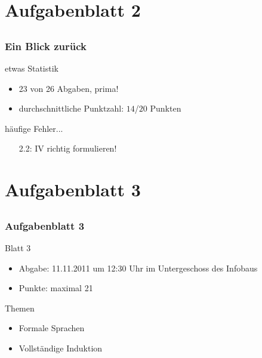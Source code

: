 \section[Blatt 2]{Aufgabenblatt 2}
\subsection*{}
\begin{frame}
	\frametitle{Ein Blick zurück}
	\begin{block}{etwas Statistik}
		\begin{itemize}
			\item 23 von 26 Abgaben, prima!
			\item durchschnittliche Punktzahl: $14$/$20$ Punkten 
		\end{itemize}
	\end{block}

	\begin{block}{häufige Fehler...}
		\begin{itemize}
			\item[2.2:] IV richtig formulieren!
		 \end{itemize}
	\end{block}

\end{frame}

\section[Blatt 3]{Aufgabenblatt 3}
\subsection*{}
\begin{frame}
        \frametitle{Aufgabenblatt 3}
        \begin{block}{Blatt 3}
					\begin{itemize}
						\item Abgabe: 11.11.2011 um 12:30 Uhr im Untergeschoss des Infobaus
						\item Punkte: maximal 21
					\end{itemize}
        \end{block}
        \begin{block}{Themen}
        \begin{itemize}
          	\item Formale Sprachen
        	\item Vollständige Induktion
        \end{itemize}
        \end{block}
\end{frame}
